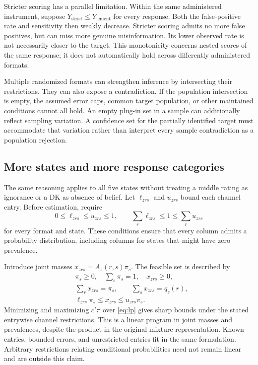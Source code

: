 \documentclass[11pt]{article}
\begin{document}
Stricter scoring has a parallel limitation. Within the same administered instrument, suppose $Y_{\mathrm{strict}}\le Y_{\mathrm{lenient}}$ for every response. Both the false-positive rate and sensitivity then weakly decrease. Stricter scoring admits no more false positives, but can miss more genuine misinformation. Its lower observed rate is not necessarily closer to the target. This monotonicity concerns nested scores of the same response; it does not automatically hold across differently administered formats.

Multiple randomized formats can strengthen inference by intersecting their restrictions. They can also expose a contradiction. If the population intersection is empty, the assumed error caps, common target population, or other maintained conditions cannot all hold. An empty plug-in set in a sample can additionally reflect sampling variation. A confidence set for the partially identified target must accommodate that variation rather than interpret every sample contradiction as a population rejection.

\subsection{More states and more response categories}

The same reasoning applies to all five states without treating a middle rating as ignorance or a DK as absence of belief. Let $\ell_{zrs}$ and $u_{zrs}$ bound each channel entry. Before estimation, require
\begin{equation}
 0\le\ell_{zrs}\le u_{zrs}\le1,\qquad
 \sum_r\ell_{zrs}\le1\le\sum_r u_{zrs}
 \label{eq:validcolumns}
\end{equation}
for every format and state. These conditions ensure that every column admits a probability distribution, including columns for states that might have zero prevalence.

Introduce joint masses $x_{zrs}=A_z(r,s)\pi_s$. The feasible set is described by
\begin{align}
 &\pi_s\ge0,\quad \sum_s\pi_s=1,\quad x_{zrs}\ge0,\nonumber\\
 &\sum_r x_{zrs}=\pi_s,\qquad \sum_s x_{zrs}=q_z(r),\label{eq:lp}\\
 &\ell_{zrs}\pi_s\le x_{zrs}\le u_{zrs}\pi_s.\nonumber
\end{align}
Minimizing and maximizing $c'\pi$ over \eqref{eq:lp} gives sharp bounds under the stated entrywise channel restrictions. This is a linear program in joint masses and prevalences, despite the product in the original mixture representation. Known entries, bounded errors, and unrestricted entries fit in the same formulation. Arbitrary restrictions relating conditional probabilities need not remain linear and are outside this claim.
\end{document}
